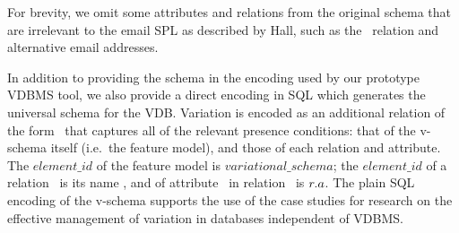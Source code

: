 %
%

%
For brevity, we omit some attributes and relations from the original schema
that are  irrelevant to the email SPL as described by Hall, such as the
\ relation and alternative email addresses. 
%


%
In addition to providing the schema in the encoding used by our 
prototype VDBMS tool, we also provide a direct encoding in SQL
which generates the
universal schema for the VDB.
%
Variation is encoded as an additional relation of the form \vdbpc\ that
captures all of the relevant presence conditions: that of the 
v-schema itself (i.e.\ the feature model), and those of each relation and
attribute.%
%
The $\mathit{element\_id}$ of the feature model is
$\mathit{variational\_schema}$; the $\mathit{element\_id}$ of a relation \vRel\
is its name \vRel, and of attribute \vAtt\ in relation \vRel\ is $\vRel.\vAtt$.
%
The plain SQL encoding of the v-schema supports the use
of the case studies for research on the effective management of variation in
databases independent of VDBMS.

